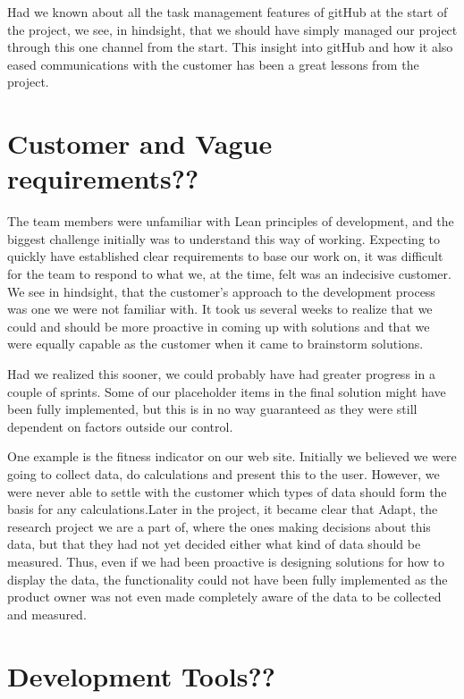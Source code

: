 Had we known about all the task management features of gitHub at the start of the project, we see, in hindsight, that we should have simply managed our project through this one channel from the start. This insight into gitHub and how it also eased communications with the customer has been a great lessons from the project.
\section{Customer and Vague requirements??}
The team members were unfamiliar with Lean principles of development, and the biggest challenge initially was to understand this way of working. Expecting to quickly have established clear requirements to base our work on, it was difficult for the team to respond to what we, at the time, felt was an indecisive customer. We see in hindsight, that the customer's approach to the development process was one we were not familiar with. It took us several weeks to realize that we could and should be more proactive in coming up with solutions and that we were equally capable as the customer when it came to brainstorm solutions.

Had we realized this sooner, we could probably have had greater progress in a couple of sprints. Some of our placeholder items in the final solution might have been fully implemented, but this is in no way guaranteed as they were still dependent on factors outside our control. 

One example is the fitness indicator on our web site. Initially we believed we were going to collect data, do calculations and present this to the user. However, we were never able to settle with the customer which types of data should form the basis for any calculations.Later in the project, it became clear that Adapt, the research project we are a part of, where the ones making decisions about this data, but that they had not yet decided either what kind of data should be measured. Thus, even if we had been proactive is designing solutions for how to display the data, the functionality could not have been fully implemented as the product owner was not even made completely aware of the data to be collected and measured.

\section{Development Tools??}